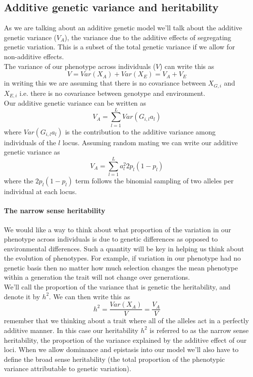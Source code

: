 \subsection{Additive genetic variance and heritability}
As we are talking about an additive genetic model we'll talk about the
additive genetic variance ($V_A$), the variance due to the additive
effects of segregating genetic variation. This is a subset of the total genetic
variance if we allow for non-additive effects. \\

The variance of our phenotype across individuals ($V$) can write this as
\begin{equation}
V = Var(X_A) + Var(X_E) = V_A+V_E
\end{equation}
in writing this we are assuming that there is no covariance between $X_{G,i}$
and $X_{E,i}$ i.e. there is no covariance between genotype and
environment. \\

Our additive genetic variance can be written as
\begin{equation}
V_A = \sum_{l=1}^L Var(G_{i,l} a_{l})
\end{equation}
where $Var(G_{i,l} a_{l})$ is the contribution to the additive
variance among individuals of the $l$ locus. Assuming random mating we
can write our additive genetic variance as
\begin{equation}
V_A = \sum_{l=1}^L a_{l}^2 2 p_l(1-p_l)
\end{equation}
where the $ 2 p_l(1-p_l)$ term follows the binomial sampling of two
alleles per individual at each locus. \\

\paragraph{The narrow sense heritability}
We would like a way to think about what proportion of the variation
in our phenotype across individuals is due to genetic differences as
opposed to environmental differences. Such a quantity will be key in
helping us think about the evolution of phenotypes. For example, if
variation in our phenotype had no genetic basis then no matter how
much selection changes the mean phenotype within a generation
the trait will not change over generations. \\

We'll call the proportion of the variance that is genetic the
heritability, and denote it by $h^2$. We can then write this as
\begin{equation}
h^2 = \frac{Var(X_A)}{V} = \frac{V_A}{V}
\end{equation}
remember that we thinking about a trait where all of the alleles act
in a perfectly additive manner. In this case our heritability $h^2$ is
referred to as the narrow sense heritability, the proportion of the
variance explained by the additive effect of our loci.
When we allow dominance
and epistasis into our model we'll also have to define the broad sense
heritability (the total proportion of the phenotypic variance
attributable to genetic variation).\\

